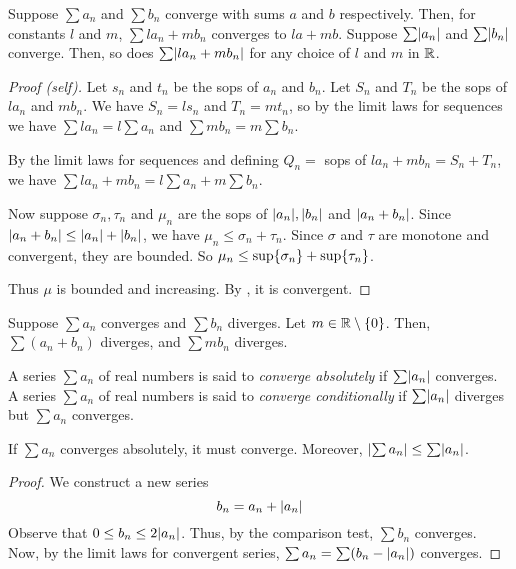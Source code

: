 \begin{thm} \label{thm:series:limit_laws}
    Suppose $\sum a_{n}$ and $\sum b_{n}$ converge with sums $a$ and $b$ respectively.
    Then, for constants $l$ and $m$, $\sum la_{n} + mb_{n}$ converges to $la + mb$.
    Suppose $\sum \abs{a_{n}}$ and $\sum \abs{b_{n}}$ converge.
    Then, so does $\sum \abs{la_{n} + mb_{n}}$ for any choice of $l$ and $m$ in $\mathbb{R}$.
\end{thm}
\begin{proof}[Proof \textcolor{self_proof}{(self)}]
    Let $s_{n}$ and $t_{n}$ be the sops of $a_{n}$ and $b_{n}$.
    Let $S_{n}$ and $T_{n}$ be the sops of $la_{n}$ and $mb_{n}$.
    We have $S_{n} = l s_{n}$ and $T_{n} = m t_{n}$, so by the limit laws for sequences we have $\sum la_{n} = l \sum a_{n}$ and $\sum mb_{n} = m \sum b_{n}$.

    By the limit laws for sequences and defining $Q_{n} =$ sops of $la_{n} + mb_{n} = S_{n} + T_{n}$, we have $\sum la_{n} + mb_{n} = l \sum a_{n} + m \sum b_{n}$.

    Now suppose $\sigma_{n}, \tau_{n}$ and $\mu_{n}$ are the sops of $\abs{a_{n}}, \abs{b_{n}}$ and $\abs{a_{n} + b_{n}}$.
    Since $\abs{a_{n} + b_{n}} \leq \abs{a_{n}} + \abs{b_{n}}$, we have $\mu_{n} \leq \sigma_{n} + \tau_{n}$.
    Since $\sigma$ and $\tau$ are monotone and convergent, they are bounded.
    So $\mu_{n} \leq \sup \set{\sigma_{n}} + \sup \set{\tau_{n}}$.

    Thus $\mu$ is bounded and increasing.
    By , it is convergent.
\end{proof}

\begin{cor} \label{thm:series:limit_laws:divergence}
    Suppose $\sum a_{n}$ converges and $\sum b_{n}$ diverges. Let $m \in \R \setminus \set{0}$. Then, $\sum(a_{n} + b_{n})$ diverges, and $\sum mb_{n}$ diverges.
\end{cor}

\begin{defn} \label{defn:series:absolute_convergence}
    A series $\sum a_{n}$ of real numbers is said to \emph{converge absolutely} if $\sum \abs{a_{n}}$ converges. A series $\sum a_{n}$ of real numbers is said to \emph{converge conditionally} if $\sum \abs{a_{n}}$ diverges but $\sum a_{n}$ converges.
\end{defn}
\begin{thm} \label{thm:series:conditional_if_absolute}
    If $\sum a_{n}$ converges absolutely, it must converge. Moreover, $\abs{\sum a_{n}} \leq \sum \abs{a_{n}}$.
\end{thm}
\begin{proof}
    We construct a new series \[
        b_{n} = a_{n} + \abs{a_{n}}
    \] Observe that $0 \leq  b_{n} \leq  2 \abs{a_{n}}$. Thus, by the comparison test, $\sum b_{n}$ converges. Now, by the limit laws for convergent series, $\sum a_{n} = \sum (b_{n} - \abs{a_{n}})$ converges.
\end{proof}

